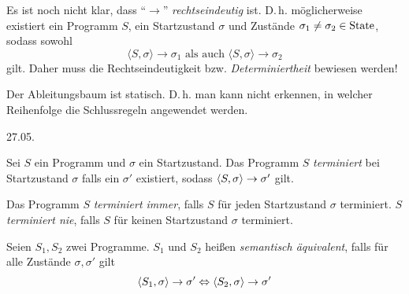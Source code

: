 \par\bigskip
\begin{remark}
    Es ist noch nicht klar, dass ``$\to$'' \emph{rechtseindeutig} ist. D.\,h. möglicherweise existiert ein Programm $S$, ein Startzustand $\sigma$ und Zustände $\sigma_1 \neq \sigma_2 \in \operatorname{State}$, sodass sowohl
    \[
    \langle S, \sigma \rangle \to \sigma_1 \text{ als auch } \langle S, \sigma \rangle \to \sigma_2
    \]
    gilt. Daher muss die Rechtseindeutigkeit bzw. \emph{Determiniertheit} bewiesen werden!
\end{remark}

\par\medskip
\begin{remark}[Ableitungsbaum]
    Der Ableitungsbaum ist statisch. D.\,h. man kann nicht erkennen, in welcher Reihenfolge die Schlussregeln angewendet werden.
\end{remark}



\newpage
\hfill 27.05.
\begin{definition}
    Sei $S$ ein Programm und $\sigma$ ein Startzustand. Das Programm $S$ \emph{terminiert} bei Startzustand $\sigma$ falls ein $\sigma'$ existiert, sodass $\langle S, \sigma \rangle \to \sigma'$ gilt.


    Das Programm $S$ \emph{terminiert immer}, falls $S$ für jeden Startzustand $\sigma$ terminiert. $S$ \emph{terminiert nie}, falls $S$ für keinen Startzustand $\sigma$ terminiert.
\end{definition}

\begin{definition}
    Seien $S_1, S_2$ zwei Programme. $S_1$ und $S_2$ heißen \emph{semantisch äquivalent}, falls für alle Zustände $\sigma, \sigma'$ gilt
    \[
    \langle S_1, \sigma \rangle \to \sigma' \Leftrightarrow \langle S_2, \sigma \rangle \to \sigma'
    \]
\end{definition}


